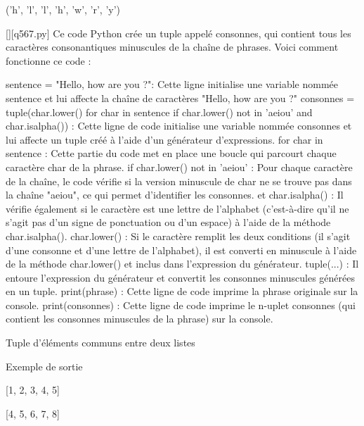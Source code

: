 ('h', 'l', 'l', 'h', 'w', 'r', 'y')
        \par
        \begin{solution}
            \renewcommand{\nomfichier}{q567.py}
            \pythonfile{\chemincode \nomfichier}[][\nomfichier]
            Ce code Python crée un tuple appelé consonnes, qui contient tous les caractères consonantiques minuscules de la chaîne de phrases. Voici comment fonctionne ce code :

    sentence = "Hello, how are you ?": Cette ligne initialise une variable nommée sentence et lui affecte la chaîne de caractères "Hello, how are you ?"
    consonnes = tuple(char.lower() for char in sentence if char.lower() not in 'aeiou' and char.isalpha()) : Cette ligne de code initialise une variable nommée consonnes et lui affecte un tuple créé à l'aide d'un générateur d'expressions.
        for char in sentence : Cette partie du code met en place une boucle qui parcourt chaque caractère char de la phrase.
        if char.lower() not in 'aeiou' : Pour chaque caractère de la chaîne, le code vérifie si la version minuscule de char ne se trouve pas dans la chaîne "aeiou", ce qui permet d'identifier les consonnes.
        et char.isalpha() : Il vérifie également si le caractère est une lettre de l'alphabet (c'est-à-dire qu'il ne s'agit pas d'un signe de ponctuation ou d'un espace) à l'aide de la méthode char.isalpha().
        char.lower() : Si le caractère remplit les deux conditions (il s'agit d'une consonne et d'une lettre de l'alphabet), il est converti en minuscule à l'aide de la méthode char.lower() et inclus dans l'expression du générateur.
        tuple(...) : Il entoure l'expression du générateur et convertit les consonnes minuscules générées en un tuple.
    print(phrase) : Cette ligne de code imprime la phrase originale sur la console.
    print(consonnes) : Cette ligne de code imprime le n-uplet consonnes (qui contient les consonnes minuscules de la phrase) sur la console.
        \end{solution}
        

        \question
        Tuple d'éléments communs entre deux listes

Exemple de sortie

[1, 2, 3, 4, 5]

[4, 5, 6, 7, 8]


